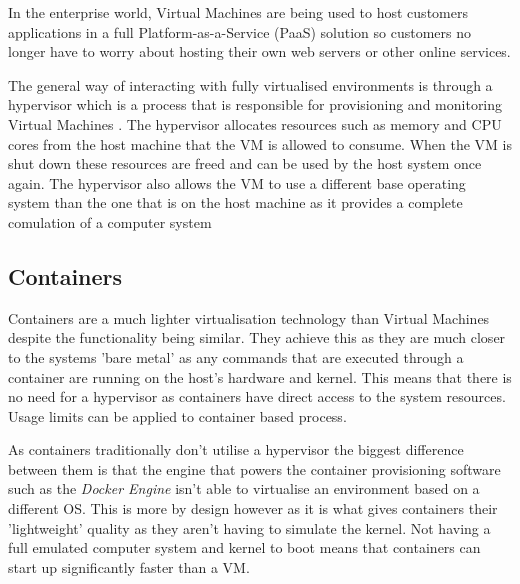 In the enterprise world, Virtual Machines are being used to host customers applications in a full Platform-as-a-Service (PaaS) solution so customers no longer have to worry about hosting their own web servers or other online services. %

The general way of interacting with fully virtualised environments is through a hypervisor which is a process that is responsible for provisioning and monitoring Virtual Machines \cite{hypervisor}. The hypervisor allocates resources such as memory and CPU cores from the host machine that the VM is allowed to consume. When the VM is shut down these resources are freed and can be used by the host system once again. The hypervisor also allows the VM to use a different base operating system than the one that is on the host machine as it provides a complete comulation of a computer system

\subsection{Containers}

Containers are a much lighter virtualisation technology than  Virtual Machines despite the functionality being similar. They achieve this as they are much closer to the systems 'bare metal' as any commands that are executed through a container are running on the host's hardware and kernel. This means that there is no need for a hypervisor as containers have direct access to the system resources. Usage limits can be applied to container based process.

As containers traditionally don't utilise a hypervisor the biggest difference between them is that the engine that powers the container provisioning software such as the \textit{Docker Engine} isn't able to virtualise an environment based on a different OS. This is more by design however as it is what gives containers their 'lightweight' quality as they aren't having to simulate the kernel. Not having a full emulated computer system and kernel to boot means that containers can start up significantly faster than a VM.

